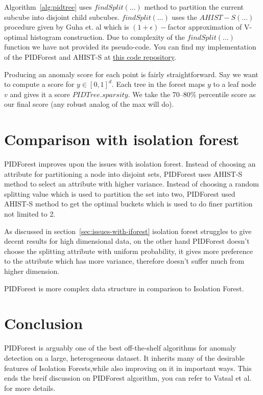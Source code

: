 \pagebreak

Algorithm~\ref{alg:pidtree} uses $findSplit(...)$ method to partition the current subcube into disjoint child subcubes.
$findSplit(...)$ uses the $AHIST-S(...)$ procedure given by Guha et. al \cite{10.1145/1132863.1132873} which is $(1+\epsilon)-$factor approximation of V-optimal histogram construction.
Due to complexity of the $findSplit(...)$ function we have not provided its pseudo-code.
You can find my implementation of the PIDForest and AHIST-S at \href{https://github.com/KishoreKaushal/AnomalyDetection/tree/master/pidforest}{this code repository}.

Producing an anomaly score for each point is fairly straightforward.
Say we want to compute a score for $y \in [0, 1]^d$.
Each tree in the forest maps $y$ to a leaf node $v$ and gives it a score $PIDTree.sparsity$.
We take the 70--80\% percentile score as our final score (any robust analog of the max will do).


\section{Comparison with isolation forest}
\label{sec:comparison-with-isolation-forest}

PIDForest improves upon the issues with isolation forest.
Instead of choosing an attribute for partitioning a node into disjoint sets, PIDForest uses AHIST-S method to select an attribute with higher variance.
Instead of choosing a random splitting value which is used to partition the set into two, PIDForest used AHIST-S method to get the optimal buckets which is used to do finer partition not limited to 2.

As discussed in section~\ref{sec:issues-with-iforest} isolation forest struggles to give decent results for high dimensional data, on the other hand PIDForest doesn't choose the splitting attribute with uniform probability, it gives more preference to the attribute which has more variance, therefore doesn't suffer much from higher dimension.

PIDForest is more complex data structure in comparison to Isolation Forest.

\section{Conclusion}
\label{sec:pidforest-conclusion}

PIDForest is arguably one of the best off-the-shelf algorithms for anomaly detection on a large, heterogeneous dataset.
It inherits many of the desirable features of Isolation Forests,while also improving on it in important ways.
This ends the breif discussion on PIDForest algorithm, you can refer to Vatsal et al. \cite{NIPS2019_9710} for more details.

